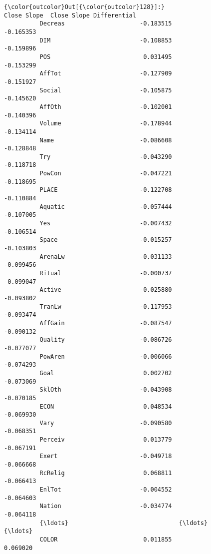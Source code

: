 \documentclass[11pt]{article}
\begin{document}
\begin{Verbatim}[commandchars=\\\{\}]
{\color{outcolor}Out[{\color{outcolor}128}]:}                           Close Slope  Close Slope Differential
          Decreas                     -0.183515                 -0.165353
          DIM                         -0.108853                 -0.159896
          POS                          0.031495                 -0.153299
          AffTot                      -0.127909                 -0.151927
          Social                      -0.105875                 -0.145620
          AffOth                      -0.102001                 -0.140396
          Volume                      -0.178944                 -0.134114
          Name                        -0.086608                 -0.128848
          Try                         -0.043290                 -0.118718
          PowCon                      -0.047221                 -0.118695
          PLACE                       -0.122708                 -0.110884
          Aquatic                     -0.057444                 -0.107005
          Yes                         -0.007432                 -0.106514
          Space                       -0.015257                 -0.103803
          ArenaLw                     -0.031133                 -0.099456
          Ritual                      -0.000737                 -0.099047
          Active                      -0.025880                 -0.093802
          TranLw                      -0.117953                 -0.093474
          AffGain                     -0.087547                 -0.090132
          Quality                     -0.086726                 -0.077077
          PowAren                     -0.006066                 -0.074293
          Goal                         0.002702                 -0.073069
          SklOth                      -0.043908                 -0.070185
          ECON                         0.048534                 -0.069930
          Vary                        -0.090580                 -0.068351
          Perceiv                      0.013779                 -0.067191
          Exert                       -0.049718                 -0.066668
          RcRelig                      0.068811                 -0.066413
          EnlTot                      -0.004552                 -0.064603
          Nation                      -0.034774                 -0.064118
          {\ldots}                               {\ldots}                       {\ldots}
          COLOR                        0.011855                  0.069020

\end{Verbatim}
\end{document}
